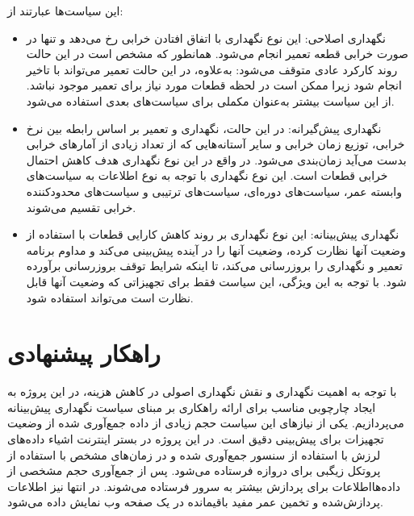 این سیاست‌ها عبارتند از:
\begin{itemize}
\item نگهداری اصلاحی: این نوع نگهداری با اتفاق افتادن خرابی رخ می‌دهد و تنها در صورت خرابی قطعه تعمیر انجام می‌شود. همانطور که مشخص است در این حالت روند کارکرد عادی متوقف می‌شود: به‌علاوه، در این حالت تعمیر می‌تواند با تاخیر انجام شود زیرا ممکن است در لحظه قطعات مورد نیاز برای تعمیر موجود نباشد. از این سیاست بیشتر به‌عنوان مکملی برای سیاست‌های بعدی استفاده می‌شود\cite{zhao2022review}.

\item نگهداری پیش‌گیرانه: در این حالت، نگهداری و تعمیر بر اساس رابطه بین نرخ خرابی، توزیع زمان خرابی و سایر آستانه‌هایی که از تعداد زیادی از آمارهای خرابی بدست می‌آید زمان‌بندی می‌شود. در واقع در این نوع نگهداری هدف کاهش احتمال خرابی قطعات است. این نوع نگهداری با توجه به نوع اطلاعات به سیاست‌های وابسته عمر، سیاست‌های دوره‌ای، سیاست‌های ترتیبی و سیاست‌های محدودکننده خرابی تقسیم می‌شوند\cite{zhao2022review}.

\item نگهداری پیش‌بینانه: این نوع نگهداری بر روند کاهش کارایی قطعات با استفاده از وضعیت آنها نظارت کرده، وضعیت آنها را در آینده پیش‌بینی می‌کند و مداوم برنامه تعمیر و نگهداری را بروزرسانی می‌کند، تا اینکه شرایط توقف بروزرسانی برآورده شود. با توجه به این ویژگی، این سیاست فقط برای تجهیزاتی که وضعیت آنها قابل نظارت است می‌تواند استفاده شود\cite{zhao2022review}.
\end{itemize} 

\section{راهکار پیشنهادی}

با توجه به اهمیت نگهداری و نقش نگهداری اصولی در کاهش هزینه، در این پروژه به ایجاد چارچوبی مناسب برای ارائه راهکاری بر مبنای سیاست نگهداری پیش‌بینانه می‌پردازیم. یکی از نیازهای این سیاست حجم زیادی از داده جمع‌آوری شده از وضعیت تجهیزات برای پیش‌بینی دقیق است. در این پروژه در بستر اینترنت اشیاء داده‌های لرزش با استفاده از سنسور  جمع‌آوری شده و در زمان‌های مشخص با استفاده از پروتکل زیگبی برای دروازه فرستاده می‌شود. پس از جمع‌آوری حجم مشخصی از داده‌هااطلاعات برای پردازش بیشتر به سرور فرستاده می‌شوند. در انتها نیز اطلاعات پردازش‌شده و تخمین عمر مفید باقیمانده در یک صفحه وب نمایش داده می‌شود.

